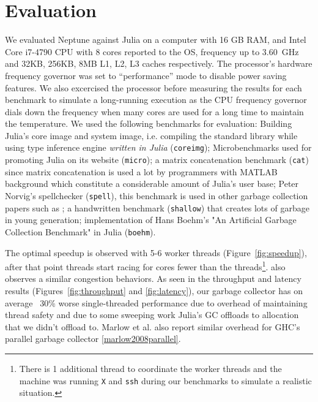 \section{Evaluation} \label{evaluation}

We evaluated Neptune against Julia on a computer with 16 GB RAM, and Intel Core i7-4790 CPU with 8 cores reported to the OS, frequency up to $3.60$~GHz and 32KB, 256KB, 8MB L1, L2, L3 caches respectively.
The processor's hardware frequency governor was set to ``performance'' mode to disable power saving features.
We also excercised the processor before measuring the results for each benchmark to simulate a long-running execution as the CPU frequency governor dials down the frequency when many cores are used for a long time to maintain the temperature.
We used the following benchmarks for evaluation: Building Julia's core image and system image, i.e. compiling the standard library while using type inference engine \emph{written in Julia} (\texttt{coreimg}); Microbenchmarks used for promoting Julia on its website (\texttt{micro}); a matrix concatenation benchmark (\texttt{cat}) since matrix concatenation is used a lot by programmers with MATLAB background which constitute a considerable amount of Julia's user base; Peter Norvig's spellchecker (\texttt{spell}), this benchmark is used in other garbage collection papers such as \cite{marlow2008parallel}; a handwritten benchmark (\texttt{shallow}) that creates lots of garbage in young generation; implementation of Hans Boehm's "An Artificial Garbage Collection Benchmark" in Julia (\texttt{boehm}).

The optimal speedup is observed with 5-6 worker threads (Figure~\ref{fig:speedup}), after that point threads start racing for cores fewer than the threads\footnote{There is 1 additional thread to coordinate the worker threads and the machine was running \texttt{X} and \texttt{ssh} during our benchmarks to simulate a realistic situation.}.
\cite{marlow2011multicore} also observes a similar congestion behaviors.
As seen in the throughput and latency results (Figures~\ref{fig:throughput} and \ref{fig:latency}), our garbage collector has on average ~30\% worse single-threaded performance due to overhead of maintaining thread safety and due to some sweeping work Julia's GC offloads to allocation that we didn't offload to.
Marlow et al. also report similar overhead for GHC's parallel garbage collector \ref{marlow2008parallel}.

